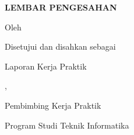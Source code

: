 \begin{titlepage}
\begin{center}
{\bfseries\Large LEMBAR PENGESAHAN\par}
\vspace{0.7cm}
{\bfseries\large \JudulLaporan\par}
\vspace{0.8cm}
Oleh\par
\NamaBerdua
\vfill
Disetujui dan disahkan sebagai\par Laporan Kerja Praktik\par
\vspace{0.7cm}
\Kota, \TanggalPengesahan\par
Pembimbing Kerja Praktik\par Program Studi Teknik Informatika\par
\vspace{2cm}
\underline{\NamaDosenPembimbing}\par
\IdentitasDosen
\vfill
\end{center}
\end{titlepage}
